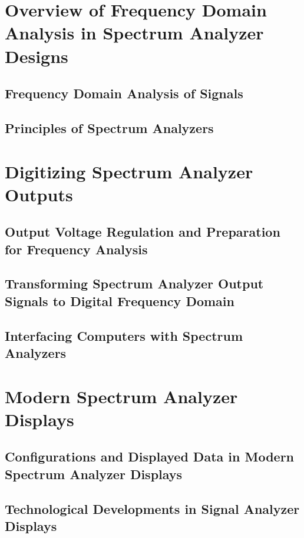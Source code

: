 \documentclass[class=report,11pt,crop=false]{standalone}
\begin{document}
\section{Overview of Frequency Domain Analysis in Spectrum Analyzer Designs}
\subsection{Frequency Domain Analysis of Signals}
\subsection{Principles of Spectrum Analyzers}
\section{Digitizing Spectrum Analyzer Outputs}
\subsection{Output Voltage Regulation and Preparation for Frequency Analysis}
\subsection{Transforming Spectrum Analyzer Output Signals to Digital Frequency Domain}
\subsection{Interfacing Computers with Spectrum Analyzers}
\section{Modern Spectrum Analyzer Displays}
\subsection{Configurations and Displayed Data in Modern Spectrum Analyzer Displays}
\subsection{Technological Developments in Signal Analyzer Displays}
\ifstandalone

\printnoidxglossary[type=\acronymtype,nonumberlist]
\fi
\end{document}
